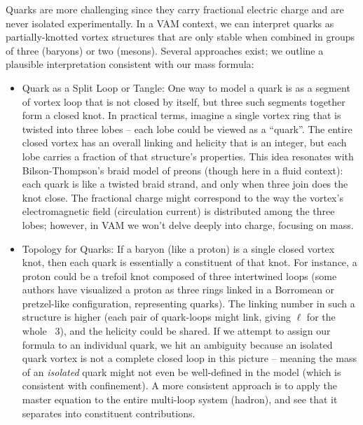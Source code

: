 Quarks are more challenging since they carry fractional electric charge and are never isolated experimentally. In a VAM context, we can interpret quarks as partially-knotted vortex structures that are only stable when combined in groups of three (baryons) or two (mesons). Several approaches exist; we outline a plausible interpretation consistent with our mass formula:\begin{itemize}

\item
Quark as a Split Loop or Tangle: One way to model a quark is as a segment of vortex loop that is not closed by itself, but three such segments together form a closed knot. In practical terms, imagine a single vortex ring that is twisted into three lobes – each lobe could be viewed as a “quark”. The entire closed vortex has an overall linking and helicity that is an integer, but each lobe carries a fraction of that structure’s properties. This idea resonates with Bilson-Thompson’s braid model of preons (though here in a fluid context): each quark is like a twisted braid strand, and only when three join does the knot close. The fractional charge might correspond to the way the vortex’s electromagnetic field (circulation current) is distributed among the three lobes; however, in VAM we won’t delve deeply into charge, focusing on mass.

\item
Topology for Quarks: If a baryon (like a proton) is a single closed vortex knot, then each quark is essentially a constituent of that knot. For instance, a proton could be a trefoil knot composed of three intertwined loops (some authors have visualized a proton as three rings linked in a Borromean or pretzel-like configuration, representing quarks). The linking number in such a structure is higher (each pair of quark-loops might link, giving $\ell$ for the whole ~3), and the helicity could be shared. If we attempt to assign our formula to an individual quark, we hit an ambiguity because an isolated quark vortex is not a complete closed loop in this picture – meaning the mass of an \textit{isolated} quark might not even be well-defined in the model (which is consistent with confinement). A more consistent approach is to apply the master equation to the entire multi-loop system (hadron), and see that it separates into constituent contributions.


\end{itemize}
